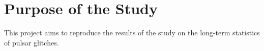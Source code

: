 \chapter*{Purpose of the Study}

\label{sec:purpose_of_the_study}

This project aims to reproduce the results of the study \cite{10.1093/mnras/staa935} on the long-term statistics of pulsar glitches.